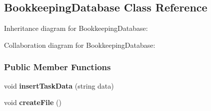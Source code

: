 \hypertarget{a00006}{}\subsection{Bookkeeping\+Database Class Reference}
\label{a00006}


Inheritance diagram for Bookkeeping\+Database\+:


Collaboration diagram for Bookkeeping\+Database\+:
\subsubsection*{Public Member Functions}
\begin{DoxyCompactItemize}
\item 
\hypertarget{a00006_a16c4a4334e3c093df2e158f82bbbd09c}{}void {\bfseries insert\+Task\+Data} (string data)\label{a00006_a16c4a4334e3c093df2e158f82bbbd09c}

\item 
\hypertarget{a00006_acce0f8743a2943476172fe5b3e2626e3}{}void {\bfseries create\+File} ()\label{a00006_acce0f8743a2943476172fe5b3e2626e3}

\end{DoxyCompactItemize}
